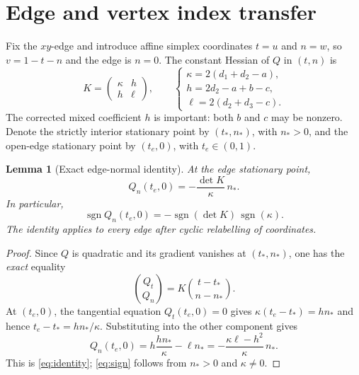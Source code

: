 \documentclass[10pt,a4paper]{article}
\theoremstyle{plain}
\newtheorem{lemma}[theorem]{Lemma}
\theoremstyle{remark}
\newcommand{\sgn}{\operatorname{sgn}}
\begin{document}
\section{Edge and vertex index transfer}
Fix the $xy$-edge and introduce affine simplex coordinates $t=u$ and $n=w$, so $v=1-t-n$ and the edge is $n=0$. The constant Hessian of $Q$ in $(t,n)$ is
\begin{equation}\label{eq:K}
 K=\begin{pmatrix}\kappa&h\\h&\ell\end{pmatrix},\qquad
 \begin{cases}
 \kappa=2(d_1+d_2-a),\\
 h=2d_2-a+b-c,\\
 \ell=2(d_2+d_3-c).
 \end{cases}
\end{equation}
The corrected mixed coefficient $h$ is important: both $b$ and $c$ may be nonzero. Denote the strictly interior stationary point by $(t_*,n_*)$, with $n_*>0$, and the open-edge stationary point by $(t_e,0)$, with $t_e\in(0,1)$.

\begin{lemma}[Exact edge-normal identity]\label{lem:edge}
At the edge stationary point,
\begin{equation}\label{eq:identity}
 Q_n(t_e,0)=-\frac{\det K}{\kappa}\,n_*.
\end{equation}
In particular,
\begin{equation}\label{eq:sign}
 \sgn Q_n(t_e,0)=-\sgn(\det K)\,\sgn(\kappa).
\end{equation}
The identity applies to every edge after cyclic relabelling of coordinates.
\end{lemma}
\begin{proof}
Since $Q$ is quadratic and its gradient vanishes at $(t_*,n_*)$, one has the \emph{exact} equality
\[
 \binom{Q_t}{Q_n}=K\binom{t-t_*}{n-n_*}.
\]
At $(t_e,0)$, the tangential equation $Q_t(t_e,0)=0$ gives $\kappa(t_e-t_*)=hn_*$ and hence $t_e-t_*=hn_*/\kappa$. Substituting into the other component gives
\[
 Q_n(t_e,0)=h\frac{h n_*}{\kappa}-\ell n_*
 =-\frac{\kappa\ell-h^2}{\kappa}\,n_*.
\]
This is \eqref{eq:identity}; \eqref{eq:sign} follows from $n_*>0$ and $\kappa\ne0$.
\end{proof}
\end{document}
